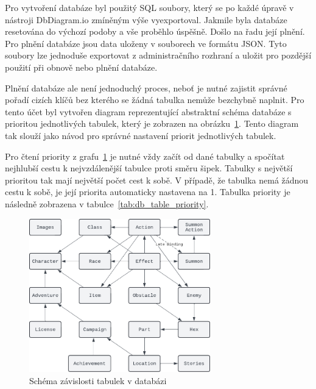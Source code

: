 Pro vytvoření databáze byl použitý SQL soubory, který se po každé úpravě v nástroji DbDiagram.io zmíněným výše vyexportoval. Jakmile byla databáze resetována do výchozí podoby a vše proběhlo úspěšně. Došlo na řadu její plnění. Pro plnění databáze jsou data uloženy v souborech ve formátu JSON. Tyto soubory lze jednoduše exportovat z administračního rozhraní a uložit pro pozdější použití při obnově nebo plnění databáze.

Plnění databáze ale není jednoduchý proces, neboť je nutné zajistit správné pořadí cizích klíčů bez kterého se žádná tabulka nemůže bezchybně naplnit. Pro tento účet byl vytvořen diagram reprezentující abstraktní schéma databáze s prioritou jednotlivých tabulek, který je zobrazen na obrázku~\ref{fig:db_table_priority}. Tento diagram tak slouží jako návod pro správné nastavení priorit jednotlivých tabulek.

Pro čtení priority z grafu~\ref{fig:db_table_priority} je nutné vždy začít od dané tabulky a spočítat nejhlubší cestu k nejvzdálenější tabulce proti směru šipek. Tabulky s největší prioritou tak mají největší počet cest k sobě. V případě, že tabulka nemá žádnou cestu k sobě, je její priorita automaticky nastavena na 1. Tabulka priority je následně zobrazena v tabulce~\ref{tab:db_table_priority}.

\begin{figure}[H]
    \centering
    \includegraphics[width=0.7\textwidth]{diagrams/databasePriority}
    \caption{Schéma závislosti tabulek v databázi}
    \label{fig:db_table_priority}
\end{figure}

